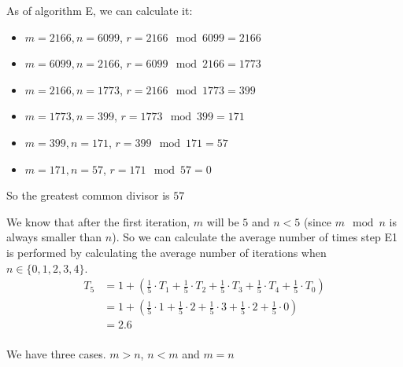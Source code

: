 \label{ex:section1.1-4}
As of algorithm E, we can calculate it:
\begin{itemize}
    \item $m = 2166, n = 6099$, $r = 2166 \mod 6099 = 2166$
    \item $m = 6099, n = 2166$, $r = 6099 \mod 2166 = 1773$
    \item $m = 2166, n = 1773$, $r = 2166 \mod 1773 = 399$
    \item $m = 1773, n = 399$, $r = 1773 \mod 399 = 171$
    \item $m = 399, n = 171$, $r = 399 \mod 171 = 57$
    \item $m = 171, n = 57$, $r = 171 \mod 57 = 0$
\end{itemize}
So the greatest common divisor is $57$

\label{ex:section1.1-5}
\tasktodo

\label{ex:section1.1-6}
We know that after the first iteration, $m$ will be $5$ and $n < 5$ (since $m \mod n$ is always smaller than $n$). So we can calculate the average number of times step E1 is performed by calculating the average number of iterations when $n \in \{0,1,2,3,4\}$.
\begin{align*}
    T_5 & = 1 + \left(\frac{1}{5} \cdot T_1 + \frac{1}{5} \cdot T_2 + \frac{1}{5} \cdot T_3 + \frac{1}{5} \cdot T_4 + \frac{1}{5} \cdot T_0 \right) \\
        & = 1 + \left(\frac{1}{5} \cdot 1 +   \frac{1}{5} \cdot 2 +   \frac{1}{5} \cdot 3 +   \frac{1}{5} \cdot 2   + \frac{1}{5} \cdot 0\right)    \\
        & = 2.6                                                                                                                                     \\
\end{align*}

\label{ex:section1.1-7}
We have three cases. $m > n$,  $n < m$ and $m = n$ \\

